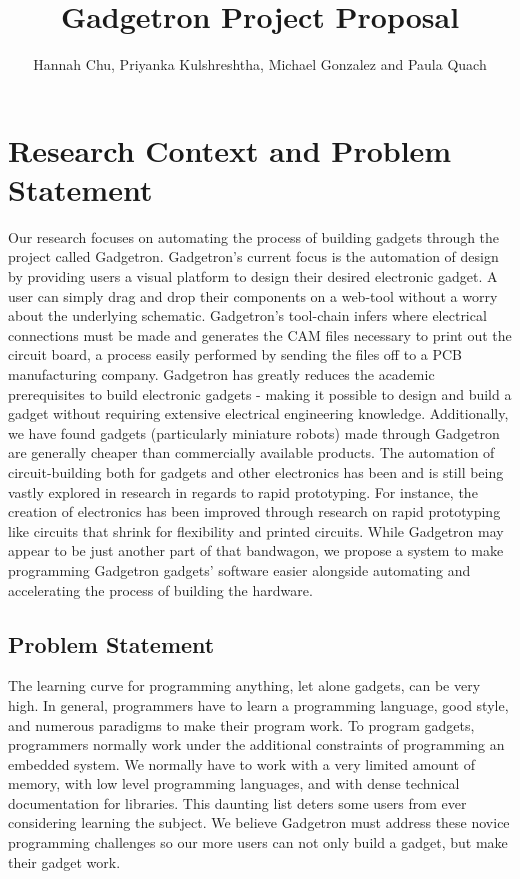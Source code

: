 \documentclass[12pt]{article}
\begin{document}
\author{Hannah Chu, Priyanka Kulshreshtha, Michael Gonzalez and Paula Quach}
\title{Gadgetron Project Proposal}
\maketitle

\section{Research Context and Problem Statement}
Our research focuses on automating the process of building gadgets through the project called Gadgetron. Gadgetron's current focus is the automation of design by providing users a visual platform to design their desired electronic gadget. A user can simply drag and drop their components on a web-tool without a worry about the underlying schematic. Gadgetron's tool-chain infers where electrical connections must be made and generates the CAM files necessary to print out the circuit board, a process easily performed by sending the files off to a PCB manufacturing company. Gadgetron has greatly reduces the academic prerequisites to build electronic gadgets - making it possible to design and build a gadget without requiring extensive electrical engineering knowledge. Additionally, we have found gadgets (particularly miniature robots) made through Gadgetron are generally cheaper than commercially available products. The automation of circuit-building both for gadgets and other electronics has been and is still being vastly explored in research in regards to rapid prototyping. For instance, the creation of electronics has been improved through research on rapid prototyping like circuits that shrink for flexibility\cite{shrinky} and printed circuits\cite{inkjets}. While Gadgetron may appear to be just another part of that bandwagon, we propose a system to make programming Gadgetron gadgets' software easier alongside automating and accelerating the process of building the hardware.
\subsection{Problem Statement}
The learning curve for programming anything, let alone gadgets, can be very high. In general, programmers have to learn a programming language, good style, and numerous paradigms to make their program work. To program gadgets, programmers normally work under the additional constraints of programming an embedded system. We normally have to work with a very limited amount of memory, with low level programming languages, and with dense technical documentation for libraries. This daunting list deters some users from ever considering learning the subject. We believe Gadgetron must address these novice programming challenges so our more users can not only build a gadget, but make their gadget work. \\
\end{document}
